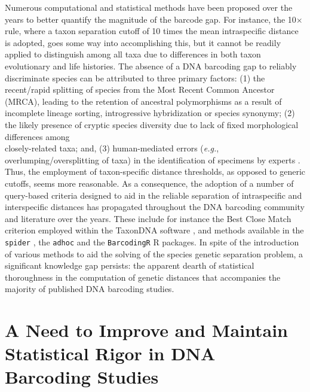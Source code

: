 Numerous computational and statistical methods have been proposed over the years to better quantify the magnitude of the barcode gap. For instance, the 10$\times$ rule, where a taxon separation cutoff of 10 times the mean intraspecific distance is adopted, goes some way into accomplishing this, but it cannot be readily applied to distinguish among all taxa due to differences in both taxon evolutionary and life histories. The absence of a DNA barcoding gap to reliably discriminate species can be attributed to three primary factors: (1) the recent/rapid splitting of species from the Most Recent Common Ancestor (MRCA), leading to the retention of ancestral polymorphisms as a result of incomplete lineage sorting, introgressive hybridization or species synonymy; (2) the likely presence of cryptic species diversity due to lack of fixed morphological differences among \\ closely-related taxa; and, (3) human-mediated errors (\textit{e.g.}, overlumping/oversplitting of taxa) in the identification of specimens by experts \cite{hubert2015dna, koroiva2018estimating}. Thus, the employment of taxon-specific distance thresholds, as opposed to generic cutoffs, seems more reasonable. As a consequence, the adoption of a number of query-based criteria designed to aid in the reliable separation of intraspecific and interspecific distances has propagated throughout the DNA barcoding community and literature over the years. These include for instance the Best Close Match criterion employed within the TaxonDNA software \cite{meier2006dna}, and methods available in the {\tt spider} \cite{brown2012spider}, the {\tt adhoc} \cite{sonet2013adhoc} and the {\tt BarcodingR} \cite{zhang2016barcoding} R packages. In spite of the introduction of various methods to aid the solving of the species genetic separation problem, a significant knowledge gap persists: the apparent dearth of statistical \\ thoroughness in the computation of genetic distances that accompanies the majority of published DNA barcoding studies. 



\section{A Need to Improve and Maintain Statistical Rigor in DNA Barcoding Studies}

